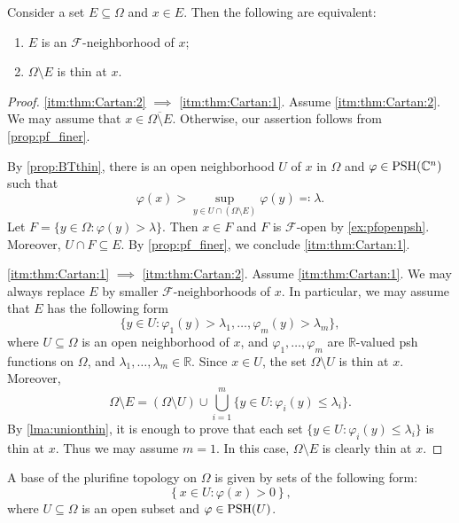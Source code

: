 \begin{theorem}[H.~Cartan]\label{thm:Cartan}
  Consider a set $E\subseteq \Omega$ and $x\in E$.
  Then the following are equivalent:
  \begin{enumerate}
    \item\label{itm:thm:Cartan:1} $E$ is an $\mathcal{F}$-neighborhood of $x$;
    \item\label{itm:thm:Cartan:2} $\Omega\setminus E$ is thin at $x$.
  \end{enumerate}
\end{theorem}
\begin{proof}
  \ref{itm:thm:Cartan:2} $\implies$ \ref{itm:thm:Cartan:1}. Assume \ref{itm:thm:Cartan:2}. We may assume that $x\in \overline{\Omega\setminus E}$. Otherwise, our assertion follows from \cref{prop:pf_finer}.

  By \cref{prop:BTthin}, there is an open neighborhood $U$ of $x$ in $\Omega$ and $\varphi\in \mathrm{PSH}(\mathbb{C}^n)$ such that
  \[
      \varphi(x)>\sup_{y\in U\cap (\Omega\setminus E)} \varphi(y)\eqqcolon \lambda.
  \]
  Let $F=\{y\in \Omega: \varphi(y)>\lambda\}$. Then $x\in F$ and $F$ is $\mathcal{F}$-open by \cref{ex:pfopenpsh}. Moreover, $U\cap F\subseteq E$. By \cref{prop:pf_finer}, we conclude \ref{itm:thm:Cartan:1}.

  \ref{itm:thm:Cartan:1} $\implies$ \ref{itm:thm:Cartan:2}. Assume \ref{itm:thm:Cartan:1}. We may always replace $E$ by smaller $\mathcal{F}$-neighborhoods of $x$. In particular, we may assume that $E$ has the following form
  \[
      \{y\in U:\varphi_1(y)>\lambda_1,\ldots,\varphi_m(y)>\lambda_m\},
  \]
  where $U\subseteq \Omega$ is an open neighborhood of $x$, and $\varphi_1,\ldots,\varphi_m$ are $\mathbb{R}$-valued psh functions on $\Omega$, and $\lambda_1,\ldots,\lambda_m\in \mathbb{R}$. Since $x\in U$, the set $\Omega\setminus U$ is thin at $x$. Moreover,
    \[
        \Omega\setminus E=(\Omega\setminus U)\cup \bigcup_{i=1}^m\{y\in U:\varphi_i(y)\leq\lambda_i\}.
    \]
    By \cref{lma:unionthin}, it is enough to prove that each set $\{y\in U:\varphi_i(y)\leq\lambda_i\}$ is thin at $x$. Thus we may assume $m=1$. In this case, $\Omega\setminus E$ is clearly thin at $x$.
\end{proof}


\begin{theorem}\label{thm:pf_basis}
  A base of the plurifine topology on $\Omega$ is given by sets of the following form:
  \begin{equation}\label{eq:basis_fine}
    \left\{x\in U: \varphi(x)>0\right\},
  \end{equation}
  where $U\subseteq \Omega$ is an open subset and $\varphi\in \mathrm{PSH}(U)$.
\end{theorem}

